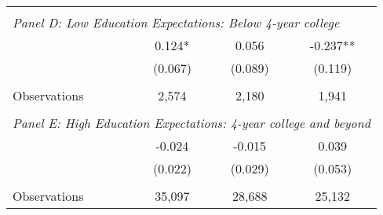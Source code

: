 {\begin{tabular}{lccc}
&  &  &   \\
\multicolumn{4}{l}{\textit{Panel D: Low Education Expectations: Below 4-year college}} \\
\hspace{3mm}        &       0.124*  &       0.056   &      -0.237** \\
                    &     (0.067)   &     (0.089)   &     (0.119)   \\
                    &               &               &               \\
\hspace{3mm}Observations&       2,574   &       2,180   &       1,941   \\
 
&  &  &   \\
\multicolumn{4}{l}{\textit{Panel E: High Education Expectations: 4-year college and beyond}} \\
\hspace{3mm}        &      -0.024   &      -0.015   &       0.039   \\
                    &     (0.022)   &     (0.029)   &     (0.053)   \\
                    &               &               &               \\
\hspace{3mm}Observations&      35,097   &      28,688   &      25,132   \\
 

\bottomrule
\end{tabular}
}

